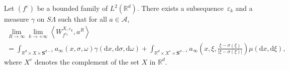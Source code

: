\documentclass[AHL,Unicode,longabstracts]{cedram}
\newcommand*\R{{\mathbb R}}
\newcommand*\eps{\varepsilon}
\numberwithin{equation}{section}
\newcommand*{\dd}{\mathrm{d}}
\newcommand*{\dx}{\dd x}
\newcommand*{\dxi}{\dd \xi}
\newcommand*{\dsigma}{\dd \sigma}
\newcommand*{\domega}{\dd \omega}
\begin{document}
\begin{prop}\label{prop4.4}
Let $(f^\eps)$ be a bounded family of $L^2(\R^d)$. There exists a subsequence~$\eps_k$ and a measure $\gamma$ on $S\Lambda$ such that for all $a\in{\mathcal A}$,
\begin{multline*}
\lim_{R\to\infty} \lim_{k\to +\infty}\left\langle W^{X,\eps_k}_{f^{\eps_k}},a^{R}\right\rangle\\
=\int_{\R^d\times X\times \mathbf{S}^{d-1}}\!a_\infty (x,\sigma,\omega) \gamma(\dx,\dsigma,\domega)
+
\int_{\R^d\times X^c\times \mathbf{S}^{d-1}}\!a_\infty\!\left(\!x,\xi,\frac{\xi-\sigma(\xi)}{|\xi-\sigma(\xi)|}\!\right)\!\mu(\dx,\dxi),
\end{multline*}
where $X^c$ denotes the complement of the set $X$ in $\R^d$.
\end{prop}
\end{document}
